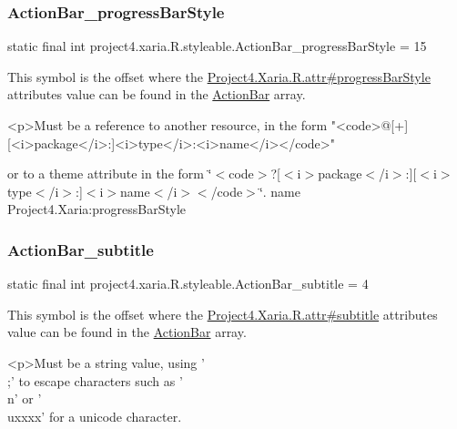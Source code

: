\subsubsection{\texorpdfstring{Action\+Bar\+\_\+progress\+Bar\+Style}{ActionBar\_progressBarStyle}}
{\footnotesize\ttfamily static final int project4.\+xaria.\+R.\+styleable.\+Action\+Bar\+\_\+progress\+Bar\+Style = 15\hspace{0.3cm}{\ttfamily [static]}}

This symbol is the offset where the \hyperlink{}{Project4.\+Xaria.\+R.\+attr\#progress\+Bar\+Style} attribute\textquotesingle{}s value can be found in the \hyperlink{classproject4_1_1xaria_1_1R_1_1styleable_accb530194c58ee3abb15587da8869e99}{Action\+Bar} array.

\begin{DoxyVerb}      <p>Must be a reference to another resource, in the form "<code>@[+][<i>package</i>:]<i>type</i>:<i>name</i></code>"
\end{DoxyVerb}
 or to a theme attribute in the form \char`\"{}$<$code$>$?\mbox{[}$<$i$>$package$<$/i$>$\+:\mbox{]}\mbox{[}$<$i$>$type$<$/i$>$\+:\mbox{]}$<$i$>$name$<$/i$>$$<$/code$>$\char`\"{}.  name Project4.\+Xaria\+:progress\+Bar\+Style \mbox{\label{classproject4_1_1xaria_1_1R_1_1styleable_a7cca6eb4000951d6b787beaf09c98f90}} 
\subsubsection{\texorpdfstring{Action\+Bar\+\_\+subtitle}{ActionBar\_subtitle}}
{\footnotesize\ttfamily static final int project4.\+xaria.\+R.\+styleable.\+Action\+Bar\+\_\+subtitle = 4\hspace{0.3cm}{\ttfamily [static]}}

This symbol is the offset where the \hyperlink{}{Project4.\+Xaria.\+R.\+attr\#subtitle} attribute\textquotesingle{}s value can be found in the \hyperlink{classproject4_1_1xaria_1_1R_1_1styleable_accb530194c58ee3abb15587da8869e99}{Action\+Bar} array.

\begin{DoxyVerb}      <p>Must be a string value, using '\\;' to escape characters such as '\\n' or '\\uxxxx' for a unicode character.
\end{DoxyVerb}
 


